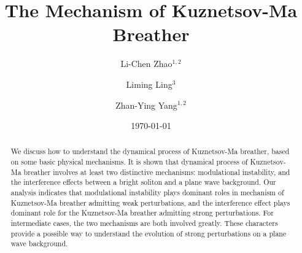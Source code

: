 \documentclass[aps,twocolumn,showpacs]{revtex4}
\begin{document}
\title{The Mechanism of Kuznetsov-Ma Breather}
\author{Li-Chen Zhao$^{1,2}$}
\author{Liming Ling$^3$}
\author{Zhan-Ying Yang$^{1,2}$}

\address{$^{1}$School of Physics, Northwest University, Xi'an, 710069, China}
\address{$^{2}$Shaanxi Key Laboratory for Theoretical Physics Frontiers, Xi'an, 710069, China}
\address{$^{3}$School of Mathematics, South China University of Technology, Guangzhou 510640, China}

\date{\today}
\begin{abstract}
We discuss how to understand the dynamical process of Kuznetsov-Ma breather, based on some basic physical mechanisms.  It is shown that dynamical process of Kuznetsov-Ma breather involves at least two distinctive mechanisms:  modulational instability, and the interference effects between a bright soliton and a plane wave background. Our analysis indicates that modulational instability plays dominant roles in mechanism of Kuznetsov-Ma breather admitting weak perturbations, and the interference effect plays dominant role for the Kuznetsov-Ma breather admitting strong  perturbations. For intermediate cases, the two mechanisms are both involved greatly. These characters provide a possible way to understand the evolution of strong perturbations on a plane wave background.


\end{abstract}
\maketitle


\end{document}
